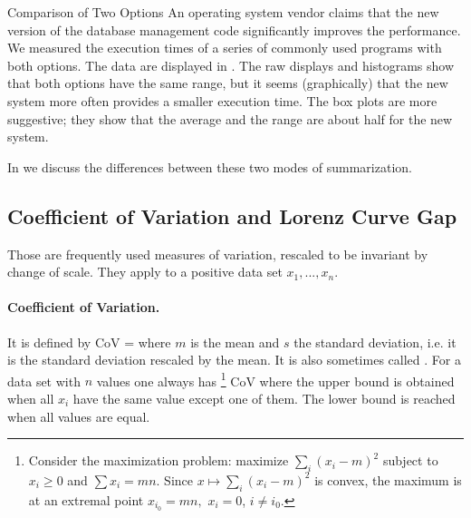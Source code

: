 \begin{figure}[htbp]
\end{figure}


\begin{ex}{Comparison of Two Options}
An operating system vendor claims that the new
version of the database management code
significantly improves the performance. We
measured the execution times of a series of
commonly used programs with both options. The
data are displayed in . The raw
displays and histograms show that both options
have the same range, but it seems (graphically)
that the new system more often provides a smaller
execution time. The box plots are more
suggestive; they show that the average and the
range are about half for the new system.
\end{ex}


In  we discuss the differences
between these two modes of summarization.



\subsection{Coefficient of Variation and Lorenz Curve Gap}
\label{sec-var} Those are frequently used
measures of variation, rescaled to be invariant
by change of scale. They apply to a positive data
set $x_1, ..., x_n$.

\paragraph{Coefficient of Variation. }
It is
defined by
  \be
  \mbox{CoV} =   \label{eq-cov}
  \ee
where $m$ is the mean and $s$ the standard
deviation, i.e. it is the standard deviation
rescaled by the mean. It is also sometimes called
. For a data set
with $n$ values one always has%
\footnote{Consider the maximization problem:
maximize $\sum_i (x_i-m)^2$ subject to $x_i \geq
0$ and $\sum x_i= mn$. Since $x \mapsto \sum_i
(x_i-m)^2$ is convex, the maximum is at an
extremal point $x_{i_0}=mn,$ $x_i= 0$, $i\neq
i_0$.}
  \leq \mbox{CoV} \leq {}
 \label{eq-cv-bounds}
 \ee
where the upper bound is obtained when all $x_i$ have the same
value except one of them. The lower bound is reached when all
values are equal.

